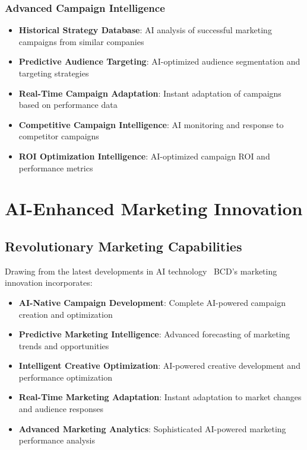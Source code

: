 \documentclass[12pt,a4paper]{book}
\begin{document}
\subsubsection{Advanced Campaign Intelligence}

\begin{itemize}
    \item \textbf{Historical Strategy Database}: AI analysis of successful marketing campaigns from similar companies
    \item \textbf{Predictive Audience Targeting}: AI-optimized audience segmentation and targeting strategies
    \item \textbf{Real-Time Campaign Adaptation}: Instant adaptation of campaigns based on performance data
    \item \textbf{Competitive Campaign Intelligence}: AI monitoring and response to competitor campaigns
    \item \textbf{ROI Optimization Intelligence}: AI-optimized campaign ROI and performance metrics
\end{itemize}

\section{AI-Enhanced Marketing Innovation}

\subsection{Revolutionary Marketing Capabilities}

Drawing from the latest developments in AI technology \, BCD's marketing innovation incorporates:

\begin{itemize}
    \item \textbf{AI-Native Campaign Development}: Complete AI-powered campaign creation and optimization
    \item \textbf{Predictive Marketing Intelligence}: Advanced forecasting of marketing trends and opportunities
    \item \textbf{Intelligent Creative Optimization}: AI-powered creative development and performance optimization
    \item \textbf{Real-Time Marketing Adaptation}: Instant adaptation to market changes and audience responses
    \item \textbf{Advanced Marketing Analytics}: Sophisticated AI-powered marketing performance analysis
\end{itemize}
\end{document}
